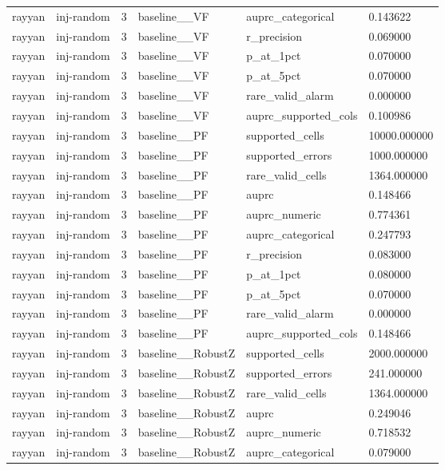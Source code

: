\begin{tabular}{llllll}
rayyan & inj-random & 3 & baseline\_\_VF & auprc\_categorical & 0.143622 \\
rayyan & inj-random & 3 & baseline\_\_VF & r\_precision & 0.069000 \\
rayyan & inj-random & 3 & baseline\_\_VF & p\_at\_1pct & 0.070000 \\
rayyan & inj-random & 3 & baseline\_\_VF & p\_at\_5pct & 0.070000 \\
rayyan & inj-random & 3 & baseline\_\_VF & rare\_valid\_alarm & 0.000000 \\
rayyan & inj-random & 3 & baseline\_\_VF & auprc\_supported\_cols & 0.100986 \\
rayyan & inj-random & 3 & baseline\_\_PF & supported\_cells & 10000.000000 \\
rayyan & inj-random & 3 & baseline\_\_PF & supported\_errors & 1000.000000 \\
rayyan & inj-random & 3 & baseline\_\_PF & rare\_valid\_cells & 1364.000000 \\
rayyan & inj-random & 3 & baseline\_\_PF & auprc & 0.148466 \\
rayyan & inj-random & 3 & baseline\_\_PF & auprc\_numeric & 0.774361 \\
rayyan & inj-random & 3 & baseline\_\_PF & auprc\_categorical & 0.247793 \\
rayyan & inj-random & 3 & baseline\_\_PF & r\_precision & 0.083000 \\
rayyan & inj-random & 3 & baseline\_\_PF & p\_at\_1pct & 0.080000 \\
rayyan & inj-random & 3 & baseline\_\_PF & p\_at\_5pct & 0.070000 \\
rayyan & inj-random & 3 & baseline\_\_PF & rare\_valid\_alarm & 0.000000 \\
rayyan & inj-random & 3 & baseline\_\_PF & auprc\_supported\_cols & 0.148466 \\
rayyan & inj-random & 3 & baseline\_\_RobustZ & supported\_cells & 2000.000000 \\
rayyan & inj-random & 3 & baseline\_\_RobustZ & supported\_errors & 241.000000 \\
rayyan & inj-random & 3 & baseline\_\_RobustZ & rare\_valid\_cells & 1364.000000 \\
rayyan & inj-random & 3 & baseline\_\_RobustZ & auprc & 0.249046 \\
rayyan & inj-random & 3 & baseline\_\_RobustZ & auprc\_numeric & 0.718532 \\
rayyan & inj-random & 3 & baseline\_\_RobustZ & auprc\_categorical & 0.079000 \\

\end{tabular}
